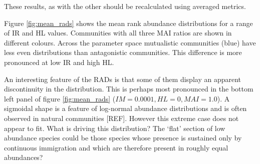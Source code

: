 \begin{itemize}
These results, as with the other should be recalculated using averaged metrics.

Figure \ref{fig:mean_rads} shows the mean rank abundance distributions for a range of IR and HL values. Communities with all three MAI ratios are shown in different colours. Across the parameter space mutualistic communities (blue) have less even distributions than antagonistic communities. This difference is more pronounced at low IR and high HL. 

An interesting feature of the RADs is that some of them display an apparent discontinuity in the distribution. This is perhaps most pronounced in the bottom left panel of figure \ref{fig:mean_rads} ($IM=0.0001, HL=0, MAI=1.0$). A sigmoidal shape is a feature of log-normal abundance distributions and is often observed in natural communities [REF]. However this extreme case does not appear to fit. What is driving this distribution?  The `flat' section of low abundance species could be those species whose presence is sustained only by continuous immigration and which are therefore present in roughly equal abundances?   



\clearpage
{}


\end{itemize}
